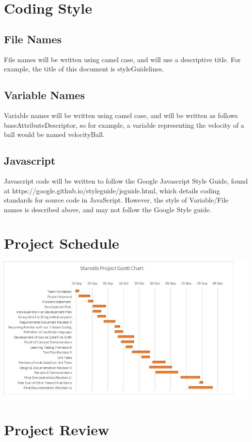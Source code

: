 \documentclass{article}
\begin{document}
\section{Coding Style}
\subsection{File Names}
File names will be written using camel case, and will use a descriptive title. For example, the title of this document is styleGuidelines.
\subsection{Variable Names}
Variable names will be written using camel case, and will be written as follows baseAttributeDescriptor, so for example, a variable representing the velocity of a ball would be named velocityBall.
\subsection{Javascript}
Javascript code will be written to follow the Google Javascript Style Guide, found at https://google.github.io/styleguide/jsguide.html, which details coding standards for source code in JavaScript. However, the style of Variable/File names is described above, and may not follow the Google Style guide.

\section{Project Schedule}
\includegraphics[scale=0.75]{gantt.jpg}

\section{Project Review}
\end{document}

